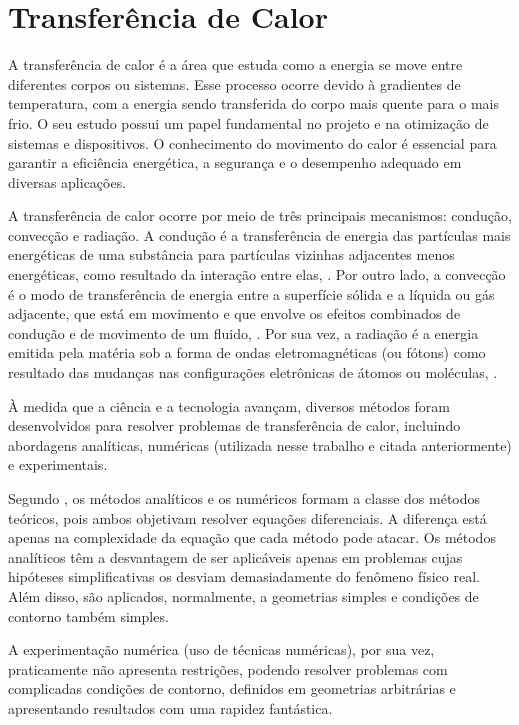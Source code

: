 \section{Transferência de Calor}

A transferência de calor é a área que estuda como a energia se move entre diferentes corpos ou sistemas. Esse processo ocorre devido à gradientes de temperatura, com a energia sendo transferida do corpo mais quente para o mais frio. O seu estudo possui um papel fundamental no projeto e na otimização de sistemas e dispositivos. O conhecimento do movimento do calor é essencial para garantir a eficiência energética, a segurança e o desempenho adequado em diversas aplicações.

A transferência de calor ocorre por meio de três principais mecanismos: condução, convecção e radiação. A condução é a transferência de energia das partículas mais energéticas de uma substância para partículas vizinhas adjacentes menos energéticas, como resultado da interação entre elas, \citep{cengel2010}. Por outro lado, a convecção é o modo de transferência de energia entre a superfície sólida e a líquida ou gás adjacente, que está em movimento e que envolve os efeitos combinados de condução e de movimento de um fluido, \citep{cengel2010}. Por sua vez, a radiação é a energia emitida pela matéria sob a forma de ondas eletromagnéticas (ou fótons) como resultado das mudanças nas configurações eletrônicas de átomos ou moléculas, \citep{cengel2010}.

À medida que a ciência e a tecnologia avançam, diversos métodos foram desenvolvidos para resolver problemas de transferência de calor, incluindo abordagens analíticas, numéricas (utilizada nesse trabalho e citada anteriormente) e experimentais.

Segundo \citet{maliska2004}, os métodos analíticos e os numéricos formam a classe dos métodos teóricos, pois ambos objetivam resolver equações diferenciais. A diferença está apenas na complexidade da equação que cada método pode atacar. Os métodos analíticos têm a desvantagem de ser aplicáveis apenas em problemas cujas hipóteses simplificativas os desviam demasiadamente do fenômeno físico real. Além disso, são aplicados, normalmente, a geometrias simples e condições de contorno também simples. 

A experimentação numérica (uso de técnicas numéricas), por sua vez, praticamente não apresenta restrições, podendo resolver problemas com complicadas condições de contorno, definidos em geometrias arbitrárias e apresentando resultados com uma rapidez fantástica.

